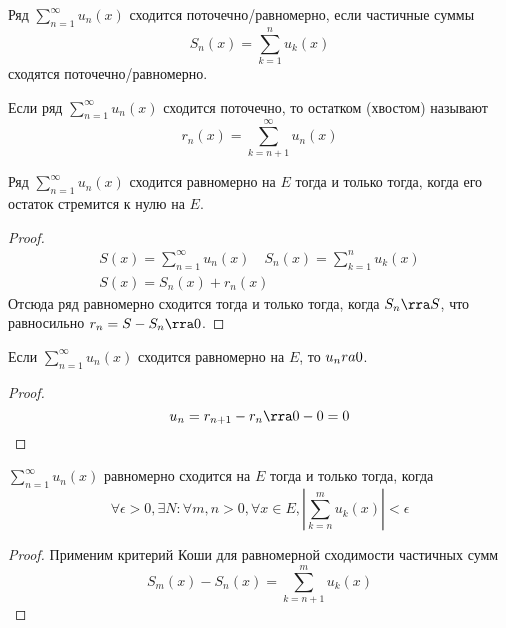 \begin{Def}
	Ряд $\sum_{n=1}^\infty u_n(x)$ сходится поточечно/равномерно, если частичные суммы
	\[ S_n(x) = \sum_{k=1}^n u_k(x) \]
	сходятся поточечно/равномерно.
\end{Def}

\begin{Def}
	Если ряд $\sum_{n=1}^\infty u_n(x)$ сходится поточечно, то остатком (хвостом) называют
	\[ r_n(x) = \sum_{k=n+1}^\infty u_n(x) \]
\end{Def}

\begin{theorem}
	Ряд $\sum_{n=1}^\infty u_n(x)$ сходится равномерно на $E$ тогда и только тогда, когда его остаток стремится к нулю на $E$.
\end{theorem}
\begin{proof}
	\begin{gather*}
		S(x) = \sum_{n=1}^\infty u_n(x) \quad S_n(x) = \sum_{k=1}^n u_k(x) \\
		S(x) = S_n(x) + r_n(x)
	\end{gather*}
	Отсюда ряд равномерно сходится тогда и только тогда, когда $S_n \rra S$, что равносильно $r_n = S - S_n \rra 0$.
\end{proof}

\begin{conseq}
	Если $\sum_{n=1}^\infty u_n(x)$ сходится равномерно на $E$, то $u_n \\ra 0$.
\end{conseq}
\begin{proof}
	\[ u_n = r_{n+1} - r_n \rra 0 - 0 = 0 \]
\end{proof}

\begin{theorem}
	$\sum_{n=1}^\infty u_n(x)$ равномерно сходится на $E$ тогда и только тогда, когда
	\[ \forall \epsilon > 0, \exists N\colon \forall m, n > 0, \forall x \in E, \left| \sum_{k=n}^m u_k(x) \right| < \epsilon \]
\end{theorem}
\begin{proof}
	Применим критерий Коши для равномерной сходимости частичных сумм
	\[ S_m(x) - S_n(x) = \sum_{k=n+1}^m u_k(x) \]
\end{proof}

